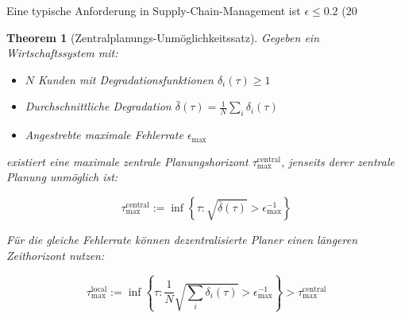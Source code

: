 \documentclass[a4paper, 12pt, twoside, openright]{report}
\newtheorem{theorem}{Theorem}[section]
\theoremstyle{definition}
\theoremstyle{definition}
\begin{document}
Eine typische Anforderung in Supply-Chain-Management ist $\epsilon \leq 0.2$ (20%

\begin{theorem}[Zentralplanungs-Unmöglichkeitssatz]
\label{thm:central_planning_impossible}
Gegeben ein Wirtschaftssystem mit:
\begin{itemize}
  \item $N$ Kunden mit Degradationsfunktionen $\delta_i(\tau) \geq 1$
  \item Durchschnittliche Degradation $\bar{\delta}(\tau) = \frac{1}{N}\sum_i \delta_i(\tau)$
  \item Angestrebte maximale Fehlerrate $\epsilon_{\max}$
\end{itemize}

existiert eine maximale zentrale Planungshorizont $\tau_{\max}^{\text{central}}$, jenseits derer zentrale Planung unmöglich ist:

\begin{equation}
\tau_{\max}^{\text{central}} := \inf\left\{\tau : \sqrt{\bar{\delta}(\tau)} > \epsilon_{\max}^{-1} \right\}
\label{eq:central_horizon}
\end{equation}

Für die gleiche Fehlerrate können dezentralisierte Planer einen längeren Zeithorizont nutzen:

\begin{equation}
\tau_{\max}^{\text{local}} := \inf\left\{\tau : \frac{1}{N}\sqrt{\sum_i \delta_i(\tau)} > \epsilon_{\max}^{-1} \right\} > \tau_{\max}^{\text{central}}
\label{eq:local_horizon}
\end{equation}
\end{theorem}
\end{document}
